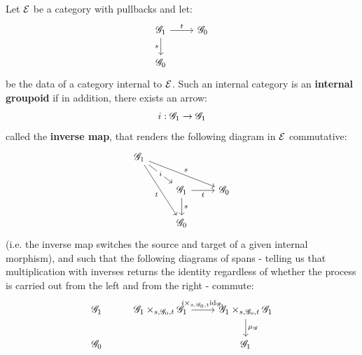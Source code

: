                     \begin{definition} \label{def: internal_groupoids}
                        Let $\E$ be a category with pullbacks and let:
                            $$
                                \begin{tikzcd}
                                	{\scrG_1} & {\scrG_0} \\
                                	{\scrG_0}
                                	\arrow["s"', from=1-1, to=2-1]
                                	\arrow["t", from=1-1, to=1-2]
                                \end{tikzcd}
                            $$
                        be the data of a category internal to $\E$. Such an internal category is an \textbf{internal groupoid} if in addition, there exists an arrow:
                            $$i: \scrG_1 \to \scrG_1$$
                        called the \textbf{inverse map}, that renders the following diagram in $\E$ commutative:
                            $$
                                \begin{tikzcd}
                                	{\scrG_1} \\
                                	& {\scrG_1} & {\scrG_0} \\
                                	& {\scrG_0}
                                	\arrow["i"{description}, from=1-1, to=2-2]
                                	\arrow["t"', from=1-1, to=3-2]
                                	\arrow["s", from=2-2, to=3-2]
                                	\arrow["t"', from=2-2, to=2-3]
                                	\arrow["s", from=1-1, to=2-3]
                                \end{tikzcd}
                            $$
                        (i.e. the inverse map switches the source and target of a given internal morphism), and such that the following diagrams of spans - telling us that multiplication with inverses returns the identity regardless of whether the process is carried out from the left and from the right - commute:
                            $$
                                \begin{tikzcd}
                                	{\scrG_1} & {\scrG_1 \x_{s, \scrG_0, t} \scrG_1} & {\scrG_1 \x_{s, \scrG_0, t} \scrG_1} \\
                                	{\scrG_0} && {\scrG_1}
                                	\arrow["{\mu_{\scrG}}", from=1-3, to=2-3]
                                	\arrow["{i \x_{s, \scrG_0, t} \id_{\scrG_1}}", from=1-2, to=1-3]

\end{tikzcd}$$
\end{definition}

